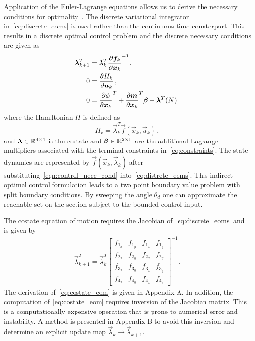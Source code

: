 \documentclass[preprint]{elsarticle}
\begin{document}
Application of the Euler-Lagrange equations allows us to derive the necessary conditions for optimality~\cite{bryson1975}.
The discrete variational integrator in~\cref{eq:discrete_eoms} is used rather than the continuous time counterpart. 
This results in a discrete optimal control problem and the discrete necessary conditions are given as
\begin{subequations}\label{eq:necc_cond}
\begin{align}
	\boldsymbol{\lambda}_{k+1}^T &= \boldsymbol{\lambda}_k^T  \frac{\partial \boldsymbol{f}_k}{\partial \boldsymbol{x}_k}^{-1} \, , \\
	0 &=  \frac{\partial H_k}{\partial \boldsymbol{u}_k} \, , \label{eqn:control_necc_cond}\\
	0 &= \frac{\partial \phi}{\partial \boldsymbol{x}_k}^T + \frac{\partial \boldsymbol{m}}{\partial \boldsymbol{x}_k}^T \boldsymbol{\beta}  - \boldsymbol{\lambda}^T(N) \, ,  
\end{align}
\end{subequations}
where the Hamiltonian \(H\) is defined as
\begin{equation}
	H_k = \vec{\lambda}_k^T \vec{f}(\vec{x}_k, \vec{u}_k) \, ,
	\label{eq:hamiltonian_opt}
\end{equation}
and \( \boldsymbol{\lambda} \in \mathbb{R}^{4 \times 1} \) is the costate and \(\boldsymbol{\beta} \in \mathbb{R}^{2 \times 1} \) are the additional Lagrange multipliers associated with the terminal constraints in~\cref{eq:constraints}.
The state dynamics are represented by \( \vec{f}(\vec{x}_k, \vec{\lambda}_k ) \) after substituting~\cref{eqn:control_necc_cond} into~\cref{eq:distrete_eoms}.
This indirect optimal control formulation leads to a two point boundary value problem with split boundary conditions. 
By sweeping the angle \( \theta_d \) one can approximate the reachable set on the \Poincare section subject to the bounded control input. 

The costate equation of motion requires the Jacobian of~\cref{eq:discrete_eoms} and is given by
\begin{align}\label{eq:costate_eom}
	\vec{\lambda}_{k+1}^T = \vec{\lambda}_k^T
	\begin{bmatrix} 
		f_{1_x} & f_{1_y} & f_{1_{\dot{x}}} & f_{1_{\dot{y}}} \\
		f_{2_x} & f_{2_y} & f_{2_{\dot{x}}} & f_{2_{\dot{y}}} \\
		f_{3_x} & f_{3_y} & f_{3_{\dot{x}}} & f_{3_{\dot{y}}} \\
		f_{4_x} & f_{4_y} & f_{4_{\dot{x}}} & f_{4_{\dot{y}}}
	\end{bmatrix} ^ {-1} \, .
\end{align}
The derivation of~\cref{eq:costate_eom} is given in Appendix A.
In addition, the computation of~\cref{eq:costate_eom} requires inversion of the Jacobian matrix.
This is a computationally expensive operation that is prone to numerical error and instability.
A method is presented in Appendix B to avoid this inversion and determine an explicit update map \( \vec{\lambda}_k \to \vec{\lambda}_{k+1} \).
\end{document}
